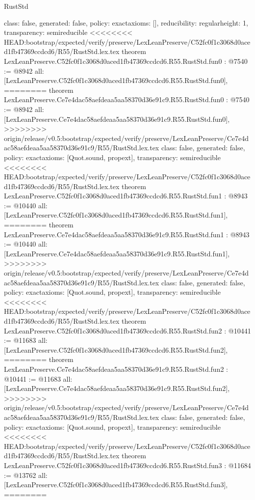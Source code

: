 \begin{lexlean}{RustStd}
\begin{coremodule}
{\begin{coremodule}
{{{  class: false,
  generated: false,
  policy: exact{axioms: []},
  reducibility: regular{height: 1},
  transparency: semireducible
}
<<<<<<<< HEAD:bootstrap/expected/verify/preserve/LexLeanPreserve/C52fc0f1c3068d0aced1fb47369ccdcd6/R55/RustStd.lex.tex
theorem LexLeanPreserve.C52fc0f1c3068d0aced1fb47369ccdcd6.R55.RustStd.fun0 : @7540 := @8942 {
  all: [LexLeanPreserve.C52fc0f1c3068d0aced1fb47369ccdcd6.R55.RustStd.fun0],
========
theorem LexLeanPreserve.Ce7e4dac58aefdeaa5aa58370d36e91c9.R55.RustStd.fun0 : @7540 := @8942 {
  all: [LexLeanPreserve.Ce7e4dac58aefdeaa5aa58370d36e91c9.R55.RustStd.fun0],
>>>>>>>> origin/release/v0.5:bootstrap/expected/verify/preserve/LexLeanPreserve/Ce7e4dac58aefdeaa5aa58370d36e91c9/R55/RustStd.lex.tex
  class: false,
  generated: false,
  policy: exact{axioms: [Quot.sound, propext]},
  transparency: semireducible
}
<<<<<<<< HEAD:bootstrap/expected/verify/preserve/LexLeanPreserve/C52fc0f1c3068d0aced1fb47369ccdcd6/R55/RustStd.lex.tex
theorem LexLeanPreserve.C52fc0f1c3068d0aced1fb47369ccdcd6.R55.RustStd.fun1 : @8943 := @10440 {
  all: [LexLeanPreserve.C52fc0f1c3068d0aced1fb47369ccdcd6.R55.RustStd.fun1],
========
theorem LexLeanPreserve.Ce7e4dac58aefdeaa5aa58370d36e91c9.R55.RustStd.fun1 : @8943 := @10440 {
  all: [LexLeanPreserve.Ce7e4dac58aefdeaa5aa58370d36e91c9.R55.RustStd.fun1],
>>>>>>>> origin/release/v0.5:bootstrap/expected/verify/preserve/LexLeanPreserve/Ce7e4dac58aefdeaa5aa58370d36e91c9/R55/RustStd.lex.tex
  class: false,
  generated: false,
  policy: exact{axioms: [Quot.sound, propext]},
  transparency: semireducible
}
<<<<<<<< HEAD:bootstrap/expected/verify/preserve/LexLeanPreserve/C52fc0f1c3068d0aced1fb47369ccdcd6/R55/RustStd.lex.tex
theorem LexLeanPreserve.C52fc0f1c3068d0aced1fb47369ccdcd6.R55.RustStd.fun2 : @10441 := @11683 {
  all: [LexLeanPreserve.C52fc0f1c3068d0aced1fb47369ccdcd6.R55.RustStd.fun2],
========
theorem LexLeanPreserve.Ce7e4dac58aefdeaa5aa58370d36e91c9.R55.RustStd.fun2 : @10441 := @11683 {
  all: [LexLeanPreserve.Ce7e4dac58aefdeaa5aa58370d36e91c9.R55.RustStd.fun2],
>>>>>>>> origin/release/v0.5:bootstrap/expected/verify/preserve/LexLeanPreserve/Ce7e4dac58aefdeaa5aa58370d36e91c9/R55/RustStd.lex.tex
  class: false,
  generated: false,
  policy: exact{axioms: [Quot.sound, propext]},
  transparency: semireducible
}
<<<<<<<< HEAD:bootstrap/expected/verify/preserve/LexLeanPreserve/C52fc0f1c3068d0aced1fb47369ccdcd6/R55/RustStd.lex.tex
theorem LexLeanPreserve.C52fc0f1c3068d0aced1fb47369ccdcd6.R55.RustStd.fun3 : @11684 := @13762 {
  all: [LexLeanPreserve.C52fc0f1c3068d0aced1fb47369ccdcd6.R55.RustStd.fun3],
========
}}}}}}
\end{coremodule}}
\end{coremodule}
\end{lexlean}
